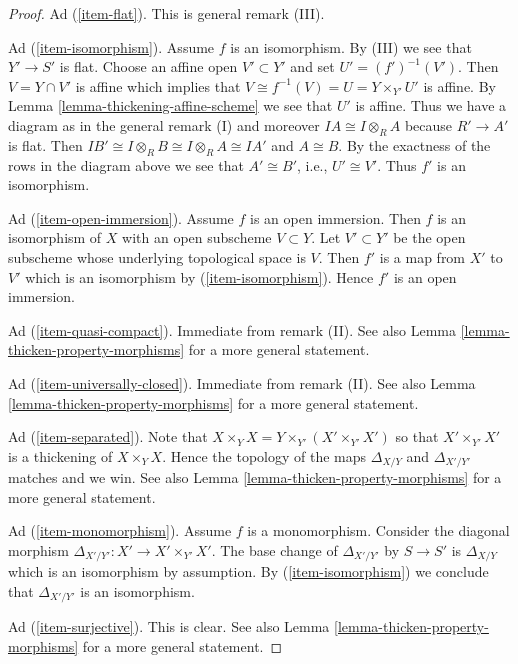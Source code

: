 \documentclass[10pt,a4paper]{amsart}
\theoremstyle{plain}
\theoremstyle{definition}
\theoremstyle{remark}
\numberwithin{equation}{subsection}
\begin{document}
\begin{proof}
\medskip\noindent
Ad (\ref{item-flat}). This is general remark (III).

\medskip\noindent
Ad (\ref{item-isomorphism}). Assume $f$ is an isomorphism.
By (III) we see that $Y' \to S'$ is flat. Choose an
affine open $V' \subset Y'$ and set $U' = (f')^{-1}(V')$. Then
$V = Y \cap V'$ is affine which implies that
$V \cong f^{-1}(V) = U = Y \times_{Y'} U'$ is affine. By
Lemma \ref{lemma-thickening-affine-scheme}
we see that $U'$ is affine. Thus we have a diagram as in the
general remark (I) and moreover $IA \cong I \otimes_R A$ because
$R' \to A'$ is flat. Then
$IB' \cong I \otimes_R B \cong I \otimes_R A \cong IA'$
and $A \cong B$. By the exactness of the rows
in the diagram above we see that $A' \cong B'$,
i.e., $U' \cong V'$. Thus $f'$ is an isomorphism.

\medskip\noindent
Ad (\ref{item-open-immersion}). Assume $f$ is an open immersion.
Then $f$ is an isomorphism of $X$ with an open subscheme $V \subset Y$.
Let $V' \subset Y'$ be the open subscheme whose underlying topological
space is $V$. Then $f'$ is a map from $X'$ to $V'$ which is an isomorphism by
(\ref{item-isomorphism}). Hence $f'$ is an open immersion.

\medskip\noindent
Ad (\ref{item-quasi-compact}). Immediate from remark (II). See also
Lemma \ref{lemma-thicken-property-morphisms} for a more general statement.

\medskip\noindent
Ad (\ref{item-universally-closed}). Immediate from remark (II). See also
Lemma \ref{lemma-thicken-property-morphisms} for a more general statement.

\medskip\noindent
Ad (\ref{item-separated}). Note that
$X \times_Y X = Y \times_{Y'} (X' \times_{Y'} X')$ so that
$X' \times_{Y'} X'$ is a thickening of $X \times_Y X$.
Hence the topology of the maps $\Delta_{X/Y}$ and $\Delta_{X'/Y'}$
matches and we win. See also
Lemma \ref{lemma-thicken-property-morphisms} for a more general statement.

\medskip\noindent
Ad (\ref{item-monomorphism}). Assume $f$ is a monomorphism.
Consider the diagonal morphism $\Delta_{X'/Y'} : X' \to X' \times_{Y'} X'$.
The base change of $\Delta_{X'/Y'}$ by $S \to S'$ is $\Delta_{X/Y}$
which is an isomorphism by assumption. By (\ref{item-isomorphism})
we conclude that $\Delta_{X'/Y'}$ is an isomorphism.

\medskip\noindent
Ad (\ref{item-surjective}). This is clear. See also
Lemma \ref{lemma-thicken-property-morphisms} for a more general statement.


\end{proof}
\end{document}

